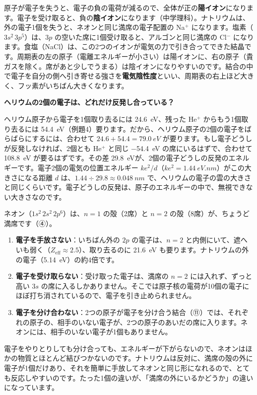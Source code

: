 \label{ph:原-7:ion}原子が電子を失うと、電子の負の電荷が減るので、全体が正の\textbf{陽イオン}になります。電子を受け取ると、負の\textbf{陰イオン}になります（中学理科）。ナトリウムは、外の電子1個を失うと、ネオンと同じ満席の電子配置の Na$^+$ になります。塩素（$3s^2\,3p^5$）は、$3p$ の空いた席に1個受け取ると、アルゴンと同じ満席の Cl$^-$ になります。食塩（NaCl）は、この2つのイオンが電気の力で引き合ってできた結晶です。周期表の左の原子（電離エネルギーが小さい）は陽イオンに、右の原子（貴ガスを除く。席があと少しでうまる）は陰イオンになりやすいのです。結合の中で電子を自分の側へ引き寄せる強さを\textbf{電気陰性度}といい、周期表の右上ほど大きく、フッ素がいちばん大きくなります。

\begin{motto}[4]
\textbf{ヘリウムの2個の電子は、どれだけ反発し合っている？}\par
ヘリウム原子から電子を1個取り去るには \qty{24.6}{eV}、残った He$^+$ からもう1個取り去るには \qty{54.4}{eV}（例題4）要ります。だから、ヘリウム原子の2個の電子をばらばらにするには、合わせて $24.6+54.4=\qty{79.0}{eV}$ が要ります。もし電子どうしが反発しなければ、2個とも He$^+$ と同じ \qty{-54.4}{eV} の席にいるはずで、合わせて \qty{108.8}{eV} が要るはずです。その差 \qty{29.8}{eV}が、2個の電子どうしの反発のエネルギーです。電子2個の電気の位置エネルギー $ke^2/d$（$ke^2=\qty{1.44}{eV.nm}$）がこの大きさになる距離 $d$ は、$1.44\div29.8\approx\qty{0.048}{nm}$ で、ヘリウムの電子の雲の大きさと同じくらいです。電子どうしの反発は、原子のエネルギーの中で、無視できない大きさなのです。
\end{motto}

\label{ph:原-7:hatena}ネオン（$1s^2\,2s^2\,2p^6$）は、$n=1$ の殻（2席）と $n=2$ の殻（8席）が、ちょうど満席です（④）。
\begin{enumerate}[label={\bkcircled{\arabic*}}, leftmargin=2.4\zw, itemsep=1pt, topsep=2pt]
\item \textbf{電子を手放さない}：いちばん外の $2p$ の電子は、$n=2$ と内側にいて、遮へいも弱く（$Z_{\mathrm{eff}}\approx2.5$）、取り去るのに \qty{21.6}{eV} も要ります。ナトリウムの外の電子（\qty{5.14}{eV}）の約4倍です。
\item \textbf{電子を受け取らない}：受け取った電子は、満席の $n=2$ には入れず、ずっと高い $3s$ の席に入るしかありません。そこでは原子核の電荷が10個の電子にほぼ打ち消されているので、電子を引き止められません。
\item \textbf{電子を分け合わない}：2つの原子が電子を分け合う結合（⑪）では、それぞれの原子の、相手のいない電子が、2つの原子のあいだの席に入ります。ネオンには、相手のいない電子が1個もありません。
\end{enumerate}
電子をやりとりしても分け合っても、エネルギーが下がらないので、ネオンはほかの物質とほとんど結びつかないのです。ナトリウムは反対に、満席の殻の外に電子が1個だけあり、それを簡単に手放してネオンと同じ形になれるので、とても反応しやすいのです。たった1個の違いが、「満席の外にいるかどうか」の違いになっています。

